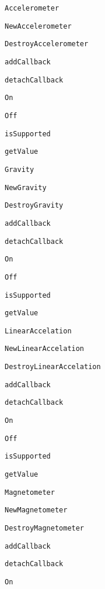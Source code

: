 \begin{DoxyItemize}
\item {\tt Accelerometer}
\begin{DoxyItemize}
\item {\tt New\-Accelerometer}
\item {\tt Destroy\-Accelerometer}
\item {\tt add\-Callback}
\item {\tt detach\-Callback}
\item {\tt On}
\item {\tt Off}
\item {\tt is\-Supported}
\item {\tt get\-Value}
\end{DoxyItemize}
\item {\tt Gravity}
\begin{DoxyItemize}
\item {\tt New\-Gravity}
\item {\tt Destroy\-Gravity}
\item {\tt add\-Callback}
\item {\tt detach\-Callback}
\item {\tt On}
\item {\tt Off}
\item {\tt is\-Supported}
\item {\tt get\-Value}
\end{DoxyItemize}
\item {\tt Linear\-Accelation}
\begin{DoxyItemize}
\item {\tt New\-Linear\-Accelation}
\item {\tt Destroy\-Linear\-Accelation}
\item {\tt add\-Callback}
\item {\tt detach\-Callback}
\item {\tt On}
\item {\tt Off}
\item {\tt is\-Supported}
\item {\tt get\-Value}
\end{DoxyItemize}
\item {\tt Magnetometer}
\begin{DoxyItemize}
\item {\tt New\-Magnetometer}
\item {\tt Destroy\-Magnetometer}
\item {\tt add\-Callback}
\item {\tt detach\-Callback}
\item {\tt On}

\end{DoxyItemize}
\end{DoxyItemize}
